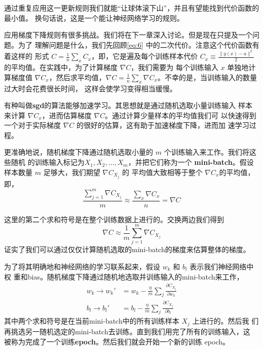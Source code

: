 通过重复应用这一更新规则我们就能“让球体滚下山”，并且有望能找到代价函数的最小值。
换句话说，这是一个能让神经网络学习的规则。

应用梯度下降规则有很多挑战。我们将在下一章深入讨论。但是现在只提及一个问题。为了
理解问题是什么，我们先回顾\eqref{eq:6} 中的二次代价。注意这个代价函数有着这样的
形式 $C = \frac{1}{n} \sum_x C_x$，即，它是遍及每个训练样本代价 $C_x \equiv
\frac{\|y(x)-a\|^2}{2}$ 的平均值。在实践中，为了计算梯度 $\nabla C$，我们需要为
每个训练输入 $x$ 单独地计算梯度值 $\nabla C_x$，然后求平均值，$\nabla C =
\frac{1}{n} \sum_x \nabla C_x$。不幸的是，当训练输入的数量过大时会花费很长时间，
这样会使学习变得相当缓慢。

有种叫做\textbf{\gls{sgd}}的算法能够加速学习。其思想就是通过随机选取小量训练输入
样本来计算 $\nabla C_x$，进而估算梯度 $\nabla C$。通过计算少量样本的平均值我们可
以快速得到一个对于实际梯度 $\nabla C$ 的很好的估算，这有助于加速梯度下降，进而加
速学习过程。

更准确地说，随机梯度下降通过随机选取小量的 $m$ 个训练输入来工作。我们将这些随机
的训练输入标记为$X_1, X_2, \ldots, X_m$，并把它们称为一个%
\textbf{\gls{mini-batch}}。假设样本数量 $m$ 足够大，我们期望 $\nabla C_{X_j}$ 的
平均值大致相等于整个 $\nabla C_x$的平均值，即，
\begin{equation}
  \frac{\sum_{j=1}^m \nabla C_{X_{j}}}{m} \approx \frac{\sum_x \nabla C_x}{n} = \nabla C
  \label{eq:18}\tag{18}
\end{equation}

这里的第二个求和符号是在整个训练数据上进行的。交换两边我们得到
\begin{equation}
  \nabla C \approx \frac{1}{m} \sum_{j=1}^m \nabla C_{X_{j}}
  \label{eq:19}\tag{19}
\end{equation}
证实了我们可以通过仅仅计算随机选取的\gls*{mini-batch}的梯度来估算整体的梯度。

为了将其明确地和神经网络的学习联系起来，假设 $w_k$ 和 $b_l$ 表示我们神经网络中权
重和\gls*{bias}。随机梯度下降通过随机地选取并训练输入的\gls*{mini-batch}来工作，
\begin{align}
  \label{eq:20}w_k \rightarrow w_k' &= w_k-\frac{\eta}{m}
                                      \sum_j \frac{\partial C_{X_j}}{\partial w_k}
                                      \tag{20}\\
  \label{eq:21}b_l \rightarrow b_l' &= b_l-\frac{\eta}{m}
                                      \sum_j \frac{\partial C_{X_j}}{\partial b_l}
                                      \tag{21}
\end{align}
其中两个求和符号是在当前\gls*{mini-batch}中的所有训练样本 $X_j$ 上进行的。然后我
们再挑选另一随机选定的\gls*{mini-batch}去训练。直到我们用完了所有的训练输入，这
被称为完成了一个训练\textbf{\gls{epoch}}。然后我们就会开始一个新的训练
\gls*{epoch}。


